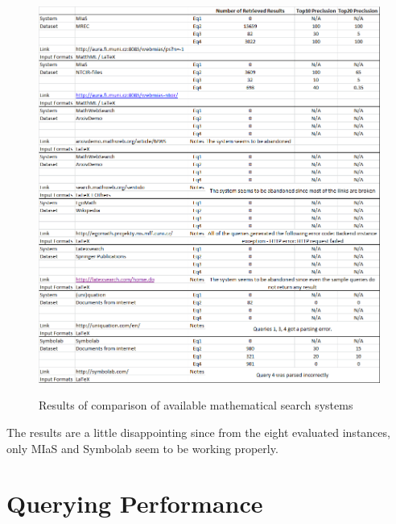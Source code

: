 \begin{figure}
\includegraphics[height=15 cm]{figures/comparison_table.png}
\label{comparison_sw_table}
\caption{Results of comparison of available mathematical search systems}
\end{figure}

The results are a little disappointing since from the eight evaluated instances, only MIaS and Symbolab seem to be working properly. 

\section{Querying Performance}



